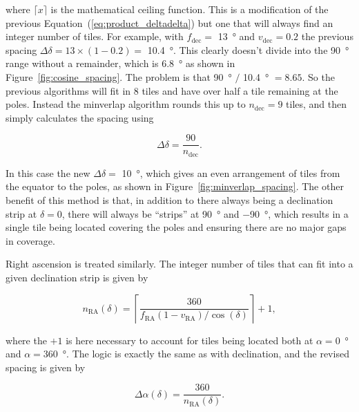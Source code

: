 \begin{colsection}
\begin{colsection}
where $\lceil x \rceil$ is the mathematical ceiling function. This is a modification of the previous Equation~(\ref{eq:product_deltadelta}) but one that will always find an integer number of tiles. For example, with $f_\text{dec} = $ \SI{13}{\degree} and $v_\text{dec} = 0.2$ the previous spacing $\Delta\delta = 13 \times (1-0.2) = $ \SI{10.4}{\degree}. This clearly doesn't divide into the \SI{90}{\degree} range without a remainder, which is \SI{6.8}{\degree} as shown in Figure~\ref{fig:cosine_spacing}. The problem is that \SI{90}{\degree} $/$ \SI{10.4}{\degree} $= 8.65$. So the previous algorithms will fit in 8 tiles and have over half a tile remaining at the poles. Instead the minverlap algorithm rounds this up to $n_\text{dec} = 9$ tiles, and then simply calculates the spacing using

\begin{equation}
    \Delta\delta = \frac{90}{n_\text{dec}}.
    \label{eq:minverlap_deltadelta}
\end{equation}

In this case the new $\Delta\delta = $ \SI{10}{\degree}, which gives an even arrangement of tiles from the equator to the poles, as shown in Figure~\ref{fig:minverlap_spacing}. The other benefit of this method is that, in addition to there always being a declination strip at $\delta=0$, there will always be ``strips'' at \SI{+90}{\degree} and \SI{-90}{\degree}, which results in a single tile being located covering the poles and ensuring there are no major gaps in coverage.

Right ascension is treated similarly. The integer number of tiles that can fit into a given declination strip is given by

\begin{equation}
    n_\text{RA}(\delta) = \left \lceil \frac{360}{f_\text{RA}(1-v_\text{RA})/\cos(\delta)} \right \rceil + 1,
    \label{eq:minverlap_nra}
\end{equation}

where the $+1$ is here necessary to account for tiles being located both at $\alpha=$\SI{0}{\degree} and $\alpha=$\SI{360}{\degree}. The logic is exactly the same as with declination, and the revised spacing is given by

\begin{equation}
    \Delta\alpha(\delta) = \frac{360}{n_\text{RA}(\delta)}.
    \label{eq:minverlap_deltaalpha}
\end{equation}


\end{colsection}
\end{colsection}

